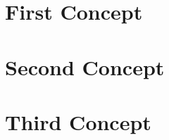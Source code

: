 \section{First Concept}\label{sec:maths1-a}
\section{Second Concept}\label{sec:maths1-b}
\section{Third Concept}\label{sec:maths1-c}

